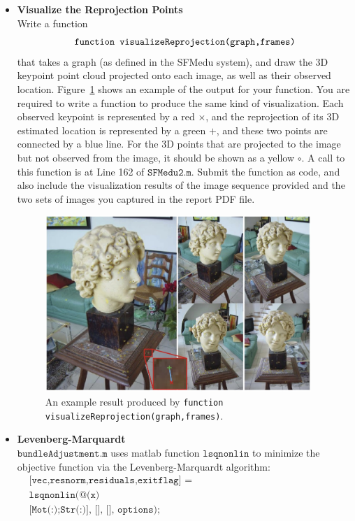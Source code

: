 \documentclass[11pt]{article}
\begin{document}
\begin{itemize}
\item{{\bf{Visualize the Reprojection Points}}\\
Write a function \vspace{-0.05in}
$$\texttt{function visualizeReprojection(graph,frames)}\vspace{-0.05in}$$
that takes a graph (as defined in the SFMedu system), and draw the 3D keypoint point cloud projected onto each image, as well as their observed location. Figure~\ref{fig:visual} shows an example of the output for your function. You are required to write a function to produce the same kind of visualization. Each observed keypoint is represented by a red $\times$, and the reprojection of its 3D estimated location is represented by a green $+$, and these two points are connected by a blue line. For the 3D points that are projected to the image but not observed from the image, it should be shown as a yellow $\circ$. A call to this function is at Line 162 of $\texttt{SFMedu2.m}$. Submit the function as code, and also include the visualization results of the image sequence provided and the two sets of images you captured in the report PDF file.}

\begin{figure}[h!]
\centering
\includegraphics[width=0.95\textwidth]{tmpimages/visual.jpg}
\caption{An example result produced by \texttt{function visualizeReprojection(graph,frames)}.}
\label{fig:visual}
\end{figure}

\item{{\bf{Levenberg-Marquardt}}\\
$\texttt{bundleAdjustment.m}$ uses matlab function $\texttt{lsqnonlin}$ to minimize the objective function via the Levenberg-Marquardt algorithm: \vspace{-0.05in}
\begin{align*}
&\texttt{[vec,resnorm,residuals,exitflag] =}\\
&\texttt{lsqnonlin(@(x) reprojectionResidual(graph.ObsIdx,graph.ObsVal,px,py,f,x),}\\
&\texttt{[Mot(:);Str(:)], [], [], options);}
\end{align*}

}
\end{itemize}
\end{document}
